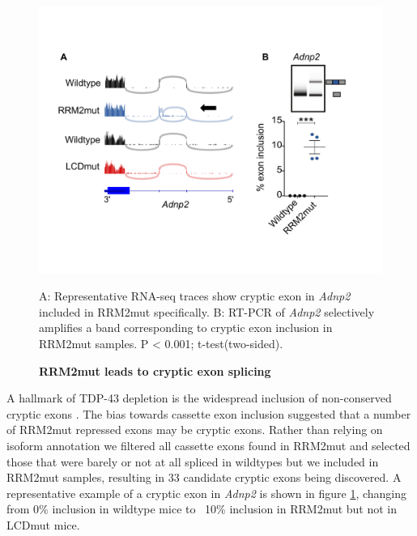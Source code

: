 \begin{figure}[h!]
	\centering
	\includegraphics[width=14cm]{Figures/05_tdp_mice/cryptic_exon_multi.png}
	\caption{\textbf{RRM2mut leads to cryptic exon splicing}}
	\label{cryptic_multi}
	A: Representative RNA-seq traces show cryptic exon in \textit{Adnp2} included in RRM2mut specifically. B: RT-PCR of \textit{Adnp2} selectively amplifies a band corresponding to cryptic exon inclusion in RRM2mut samples. P < 0.001; t-test(two-sided).
\end{figure}

A hallmark of TDP-43 depletion is the widespread inclusion of non-conserved cryptic exons \citep{Ling2015}. The bias towards cassette exon inclusion suggested that a number of RRM2mut repressed exons may be cryptic exons. Rather than relying on isoform annotation we filtered all cassette exons found in RRM2mut and selected those that were barely or not at all spliced in wildtypes but we included in RRM2mut samples, resulting in 33 candidate cryptic exons being discovered. A representative example of a cryptic exon in \textit{Adnp2} is shown in figure \ref{cryptic_multi}, changing from 0\% inclusion in wildtype mice to ~10\% inclusion in RRM2mut but not in LCDmut mice.  

